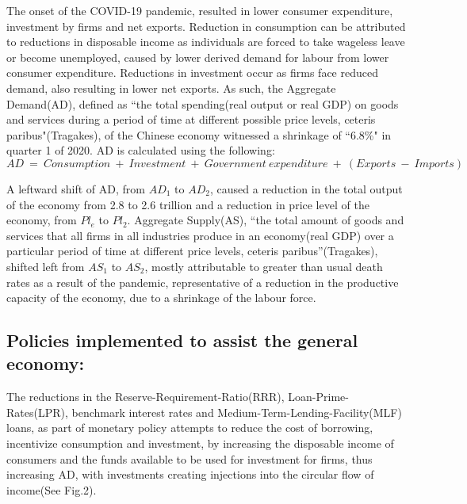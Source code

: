 \documentclass[11pt, a4paper]{article}
\begin{document}
            The onset of the COVID-19 pandemic, resulted in lower consumer expenditure, investment by firms and net exports. Reduction in consumption can be attributed to reductions in disposable income as individuals are forced to take wageless leave or become unemployed, caused by lower derived demand for labour from lower consumer expenditure. Reductions in investment occur as firms face reduced demand, also resulting in lower net exports. As such, the Aggregate Demand(AD), defined as ``the total spending(real output or real GDP) on goods and services during a period of time at different possible price levels, ceteris paribus"(Tragakes), of the Chinese economy witnessed a shrinkage of ``6.8\%" in quarter 1 of 2020. AD is calculated using the following:
            \vspace{-0.5mm}
            \begin{equation}
                AD \ = \ Consumption \ + \ Investment \ + \ Government \ expenditure \ + \ (Exports \ - \ Imports)
            \end{equation}
            
            A leftward shift of AD, from $AD_1$ to $AD_2$, caused a reduction in the total output of the economy from 2.8 to 2.6 trillion and a reduction in price level of the economy, from $Pl_e$ to $Pl_2$. Aggregate Supply(AS), ``the total amount of goods and services that all firms in all industries produce in an economy(real GDP) over a particular period of time at different price levels, ceteris paribus''(Tragakes), shifted left from $AS_1$ to $AS_2$, mostly attributable to greater than usual death rates as a result of the pandemic, representative of a reduction in the productive capacity of the economy, due to a shrinkage of the labour force.

        \subsection{Policies implemented to assist the general economy:}
           The reductions in the Reserve-Requirement-Ratio(RRR), Loan-Prime-Rates(LPR), benchmark interest rates and Medium-Term-Lending-Facility(MLF) loans, as part of monetary policy attempts to reduce the cost of borrowing, incentivize consumption and investment, by increasing the disposable income of consumers and the funds available to be used for investment for firms, thus increasing AD, with investments creating injections into the circular flow of income(See Fig.2).
\end{document}
